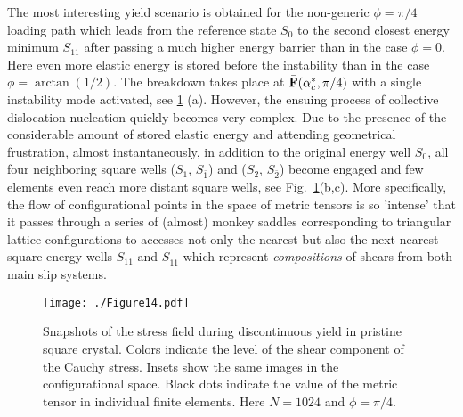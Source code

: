 \documentclass[CRPHYS,Unicode,manuscript]{cedram}
\begin{document}
 The most interesting yield scenario is obtained  for the non-generic $\phi=\pi/4$ loading  path   which leads   from the reference state  $S_0$  to the second closest  energy minimum $S_{11}$ after passing a much higher  energy barrier than in the case $\phi=0$. Here even more elastic energy is stored  before the  instability than in the case $\phi=\arctan( 1/2)$. The breakdown takes place at    $ \bar{\bf F}(\alpha_c^*,\pi/4)$  with a single
instability mode activated, see \ref{fig:th45} (a). However, the ensuing process of  collective dislocation nucleation quickly becomes very complex.  Due to the presence of the considerable amount of stored elastic energy and attending geometrical frustration, almost instantaneously, in addition to the original energy well $S_0$,  all   four neighboring square wells  ($S_1$, $S_{\bar1}$) and ($S_{2}$, $S_{\bar2}$)  become   engaged  and few elements even  reach more distant square  wells, see Fig.~\ref{fig:th45}(b,c).  More specifically,  
the  flow  of configurational points in the space of metric tensors is so 'intense' that it  passes through   a series of (almost)  monkey saddles  corresponding to triangular lattice configurations  to  accesses  not only  the    nearest  but also  the  next nearest square  energy wells  $S_{11}$ and $S_{\bar1\bar1}$ which represent  \emph{compositions} of   shears  from both main slip systems. 
  
  \begin{figure}[h!]
\centering
\texttt{[image: ./Figure14.pdf]}
\caption{\scriptsize {Snapshots of the stress field during discontinuous yield in pristine square crystal. Colors indicate the level of the shear component of the Cauchy stress. Insets show the same images in the configurational space.  Black dots indicate the value of the metric tensor in individual finite elements. Here $N=1024$ and $\phi=\pi/4$.  }
 \label{fig:th45}}
\end{figure}
\end{document}
